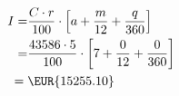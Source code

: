 	\begin{align*}
		I=&\dfrac{C\cdot r}{100}\cdot\left[a+ \dfrac{m}{12}+\dfrac{q}{360}\right]\\
		=&\dfrac{43586\cdot 5}{100}\cdot\left[7+ \dfrac{0}{12}+\dfrac{0}{360}\right]\\
		={}&\mbox{\EUR{15255.10}}
	\end{align*}
